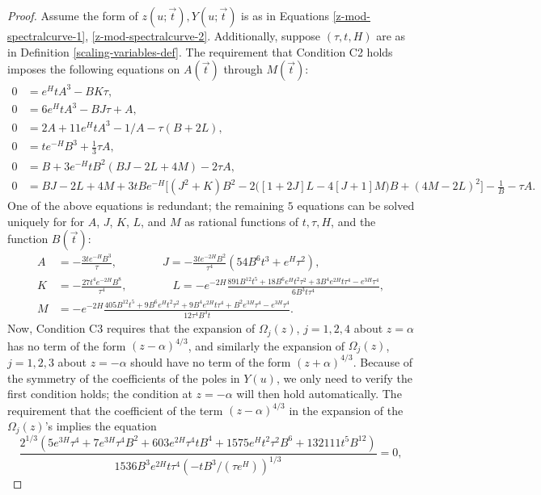 \documentclass[usenames,dvipsnames]{article}
\theoremstyle{definition}
\numberwithin{equation}{section}
\numberwithin{figure}{section}
\begin{document}
\begin{proof}
Assume the form of $z(u;\vec{t}),Y(u;\vec{t})$ is as in Equations \eqref{z-mod-spectralcurve-1}, \eqref{z-mod-spectralcurve-2}. Additionally, suppose $(\tau,t,H)$ are as in Definition \ref{scaling-variables-def}. The requirement that Condition C2 holds imposes the following equations on $A(\vec{t})$ through $M(\vec{t})$:
    \begin{align*}
        0 &= e^Ht A^3 - BK\tau,\\%
        0 &= 6e^HtA^3 - BJ\tau + A,\\
        0 &= 2A + 11e^HtA^3 - 1/A - \tau(B + 2L),\\
        0 &= te^{-H}B^3 + \frac{1}{3}\tau A,\\
        0 &= B + 3e^{-H}tB^2(BJ - 2L + 4M) - 2\tau A,\\
        0 &= BJ - 2L + 4M + 3tB e^{-H}\bigg[(J^2+K)B^2 - 2\big([1+2J]L - 4[J+1]M\big)B + (4M-2L)^2\bigg] - \frac{1}{B} - \tau A.
    \end{align*}
One of the above equations is redundant; the remaining $5$ equations can be solved uniquely for for $A$, $J$, $K$, $L$, and $M$ as rational 
functions of $t,\tau,H$, and the function $B(\vec{t})$:
    \begin{align*}
        A &= -\frac{3te^{-H}B^3}{\tau}, \qquad \qquad J = -\frac{3te^{-2H}B^2}{\tau^4}(54B^6t^3 + e^H\tau^2),\\
        K &= -\frac{27t^4e^{-2H}B^8}{\tau^4},\qquad\qquad L= -e^{-2H}\frac{891B^{12} t^5 + 18B^6e^{H}t^2\tau^2 + 3B^4e^{2H} t\tau^4 - e^{3H}\tau^4}{6B^3t \tau^4},\\
        M &= - e^{-2H}\frac{405 B^{12}t^5 + 9B^6e^{H}t^2\tau^2 + 9B^4e^{2H}t\tau^4 + B^2e^{3H}\tau^4 - e^{3H}\tau^4}{12\tau^4B^3 t}.
    \end{align*}
Now, Condition C3 requires that the expansion of $\Omega_j(z)$, $j=1,2,4$ about $z=\alpha$ has no term of the form $(z-\alpha)^{4/3}$, and similarly
the expansion of $\Omega_j(z)$, $j=1,2,3$ about $z= -\alpha$ should have no term of the form $(z+\alpha)^{4/3}$. Because of the symmetry of the
coefficients of the poles in $Y(u)$, we only need to verify the first condition holds; the condition at $z= -\alpha$ will then hold automatically. The
requirement that the coefficient of the term $(z-\alpha)^{4/3}$ in the expansion of the $\Omega_j(z)$'s implies the equation
    \begin{equation*}
       \frac{2^{1/3}(5e^{3H}\tau^4 + 7e^{3H}\tau^4B^2 + 603e^{2H}\tau^4 tB^4 + 1575e^Ht^2\tau^2B^6 + 132111t^5B^{12})}{1536B^3e^{2H}t\tau^4(-tB^3/(\tau e^H))^{1/3}} = 0,

\end{equation*}
\end{proof}
\end{document}
